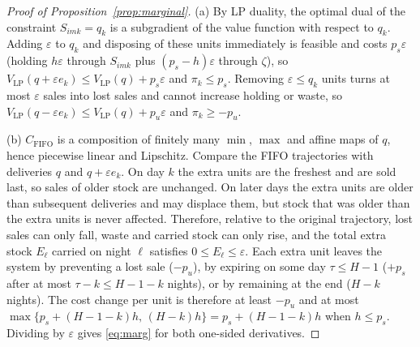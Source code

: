 \begin{proof}[Proof of Proposition~\ref{prop:marginal}]
(a) By LP duality, the optimal dual of the constraint $S_{imk}=q_k$ is a subgradient of the value function with respect to $q_k$. Adding $\varepsilon$ to $q_k$ and disposing of these units immediately is feasible and costs $p_s\varepsilon$ (holding $h\varepsilon$ through $S_{imk}$ plus $(p_s-h)\varepsilon$ through $\zeta$), so $V_{\mathrm{LP}}(q+\varepsilon e_k)\le V_{\mathrm{LP}}(q)+p_s\varepsilon$ and $\pi_k\le p_s$. Removing $\varepsilon\le q_k$ units turns at most $\varepsilon$ sales into lost sales and cannot increase holding or waste, so $V_{\mathrm{LP}}(q-\varepsilon e_k)\le V_{\mathrm{LP}}(q)+p_u\varepsilon$ and $\pi_k\ge -p_u$.

(b) $C_{\mathrm{FIFO}}$ is a composition of finitely many $\min$, $\max$ and affine maps of $q$, hence piecewise linear and Lipschitz. Compare the FIFO trajectories with deliveries $q$ and $q+\varepsilon e_k$. On day $k$ the extra units are the freshest and are sold last, so sales of older stock are unchanged. On later days the extra units are older than subsequent deliveries and may displace them, but stock that was older than the extra units is never affected. Therefore, relative to the original trajectory, lost sales can only fall, waste and carried stock can only rise, and the total extra stock $E_\ell$ carried on night $\ell$ satisfies $0\le E_\ell\le\varepsilon$. Each extra unit leaves the system by preventing a lost sale ($-p_u$), by expiring on some day $\tau\le H-1$ ($+p_s$ after at most $\tau-k\le H-1-k$ nights), or by remaining at the end ($H-k$ nights). The cost change per unit is therefore at least $-p_u$ and at most $\max\{p_s+(H-1-k)h,\,(H-k)h\}=p_s+(H-1-k)h$ when $h\le p_s$. Dividing by $\varepsilon$ gives \eqref{eq:marg} for both one-sided derivatives.
\end{proof}

